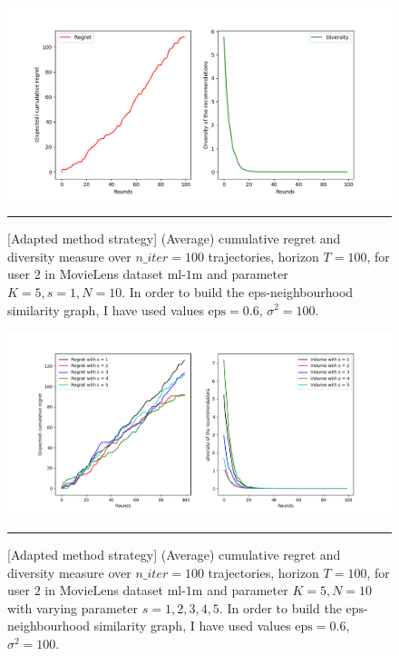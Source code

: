 \documentclass{article}
\begin{document}
\begin{figure}[H]
  \centering
  \rule[-.5cm]{0cm}{4cm}
  \includegraphics[scale=0.5]{../Results/lagree_36min16sec.png}
  \rule[-.5cm]{4cm}{0cm}
  \caption{[Adapted method strategy] (Average) cumulative regret and diversity measure over $n\_iter=100$ trajectories, horizon $T=100$, for user $2$ in MovieLens dataset $\text{ml-1m}$ and parameter $K=5, s=1, N=10$. In order to build the $\text{eps}$-neighbourhood similarity graph, I have used values $\text{eps}=0.6$, $\sigma^{2}=100$.}
\label{figlagree}
\end{figure}

\begin{figure}[H]
  \centering
  \rule[-.5cm]{0cm}{4cm}
  \includegraphics[scale=0.5]{../Results/lagree.png}
  \rule[-.5cm]{4cm}{0cm}
  \caption{[Adapted method strategy] (Average) cumulative regret and diversity measure over $n\_iter=100$ trajectories, horizon $T=100$, for user $2$ in MovieLens dataset $\text{ml-1m}$ and parameter $K=5, N=10$ with varying parameter $s=1, 2, 3, 4, 5$. In order to build the $\text{eps}$-neighbourhood similarity graph, I have used values $\text{eps}=0.6$, $\sigma^{2}=100$.}
\label{figlagreecomp}
\end{figure}
\end{document}
